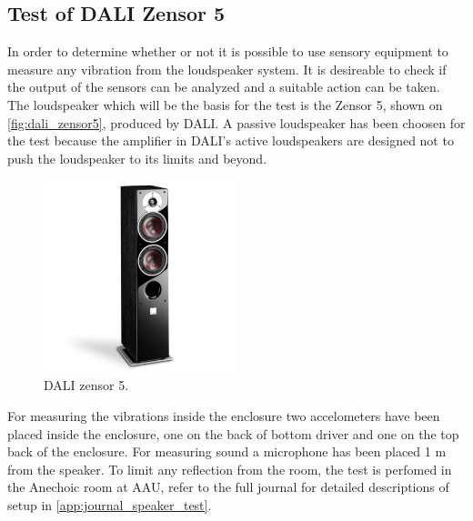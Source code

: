 \subsection*{Test of DALI Zensor 5}
In order to determine whether or not it is possible to use sensory equipment to measure any vibration from the loudspeaker system. It is desireable to check if the output of the sensors can be analyzed and a suitable action can be taken. The loudspeaker which will be the basis for the test is the Zensor 5, shown on \autoref{fig:dali_zensor5}, produced by DALI. A passive loudspeaker has been choosen for the test because the amplifier in DALI's active loudspeakers are designed not to push the loudspeaker to its limits and beyond. %

\begin{figure}[H]
\centering
\includegraphics[width=0.5\textwidth]{figures/zensor5.png}
\caption{DALI zensor 5.}
\label{fig:dali_zensor5}
\end{figure}


For measuring the vibrations inside the enclosure two accelometers have been placed inside the enclosure, one on the back of bottom driver and one on the top back of the enclosure. For measuring sound a microphone has been placed 1 m from the speaker. To limit any reflection from the room, the test is perfomed in the Anechoic room at \gls{AAU}, refer to the full journal for detailed descriptions of setup in \autoref{app:journal_speaker_test}.  



